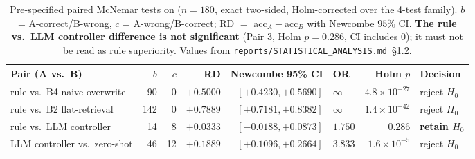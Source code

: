 \begin{table}[t]
\centering
\small
\caption{Pre-specified paired McNemar tests on \mgp{} ($n{=}180$, exact two-sided,
Holm-corrected over the 4-test family). $b$ = A-correct/B-wrong, $c$ =
A-wrong/B-correct; RD $=$ acc$_A-$acc$_B$ with Newcombe $95\%$ CI. \textbf{The
rule vs.\ LLM controller difference is not significant} (Pair 3, Holm $p{=}0.286$,
CI includes $0$); it must not be read as rule superiority. Values from
\texttt{reports/STATISTICAL\_ANALYSIS.md}~\S1.2.}
\label{tab:mcnemar}
\begin{tabular}{@{}l r r r r l r l@{}}
\toprule
Pair (A vs.\ B) & $b$ & $c$ & RD & Newcombe 95\% CI & OR & Holm $p$ & Decision \\
\midrule
rule vs.\ B4 naive-overwrite      & 90  & 0 & $+0.5000$ & $[+0.4230, +0.5690]$ & $\infty$ & $4.8\!\times\!10^{-27}$ & reject $H_0$ \\
rule vs.\ B2 flat-retrieval       & 142 & 0 & $+0.7889$ & $[+0.7181, +0.8382]$ & $\infty$ & $1.4\!\times\!10^{-42}$ & reject $H_0$ \\
rule vs.\ LLM controller          & 14  & 8 & $+0.0333$ & $[-0.0188, +0.0873]$ & $1.750$  & $0.286$                 & \textbf{retain $H_0$} \\
LLM controller vs.\ zero-shot     & 46  & 12& $+0.1889$ & $[+0.1096, +0.2664]$ & $3.833$  & $1.6\!\times\!10^{-5}$  & reject $H_0$ \\
\bottomrule
\end{tabular}
\end{table}
